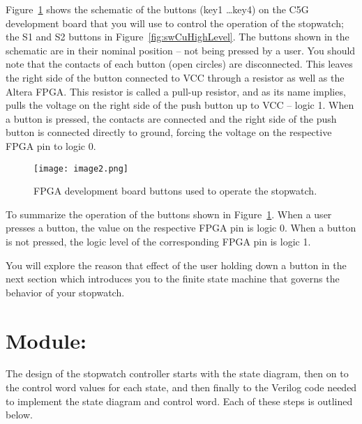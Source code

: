 Figure~\ref{fig:swCuButtons} shows the schematic of the buttons (key1 \ldots key4) on the
C5G development board that you will use to control the operation of the
stopwatch; the S1 and S2 buttons in Figure~\ref{fig:swCuHighLevel}. The buttons shown in the
schematic are in their nominal position -- not being pressed by a user.
You should note that the contacts of each button (open circles) are
disconnected. This leaves the right side of the button connected to VCC
through a resistor as well as the Altera FPGA. This resistor is called a
pull-up resistor, and as its name implies, pulls the voltage on the
right side of the push button up to VCC -- logic 1. When a button is
pressed, the contacts are connected and the right side of the push
button is connected directly to ground, forcing the voltage on the
respective FPGA pin to logic 0.

\begin{figure}[ht]
\texttt{[image: image2.png]}
\caption{FPGA development board buttons used to operate the stopwatch.}
\label{fig:swCuButtons}
\end{figure}

To summarize the operation of the buttons shown in Figure~\ref{fig:swCuButtons}. When a user
presses a button, the value on the respective FPGA pin is logic 0. When
a button is not pressed, the logic level of the corresponding FPGA pin
is logic 1.

You will explore the reason that effect of the user holding down a
button in the next section which introduces you to the finite state
machine that governs the behavior of your stopwatch.

\section{Module: }
The design of the stopwatch controller starts with the state diagram, then
on to the control word values for each state, and then finally to the 
Verilog code needed to implement the state diagram and control 
word.  Each of these steps is outlined below.

